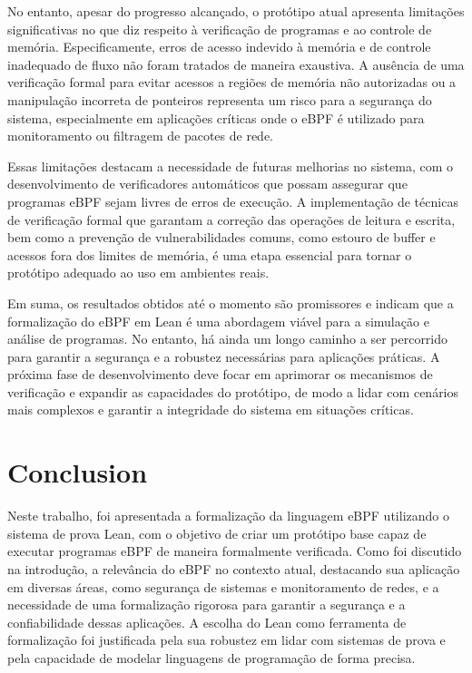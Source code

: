 \documentclass[sigconf]{acmart}
\begin{document}
No entanto, apesar do progresso alcançado, o protótipo atual apresenta limitações significativas no que diz respeito à verificação de programas e ao controle de memória. Especificamente, erros de acesso indevido à memória e de controle inadequado de fluxo não foram tratados de maneira exaustiva. A ausência de uma verificação formal para evitar acessos a regiões de memória não autorizadas ou a manipulação incorreta de ponteiros representa um risco para a segurança do sistema, especialmente em aplicações críticas onde o eBPF é utilizado para monitoramento ou filtragem de pacotes de rede.

Essas limitações destacam a necessidade de futuras melhorias no sistema, com o desenvolvimento de verificadores automáticos que possam assegurar que programas eBPF sejam livres de erros de execução. A implementação de técnicas de verificação formal que garantam a correção das operações de leitura e escrita, bem como a prevenção de vulnerabilidades comuns, como estouro de buffer e acessos fora dos limites de memória, é uma etapa essencial para tornar o protótipo adequado ao uso em ambientes reais.

Em suma, os resultados obtidos até o momento são promissores e indicam que a formalização do eBPF em Lean é uma abordagem viável para a simulação e análise de programas. No entanto, há ainda um longo caminho a ser percorrido para garantir a segurança e a robustez necessárias para aplicações práticas. A próxima fase de desenvolvimento deve focar em aprimorar os mecanismos de verificação e expandir as capacidades do protótipo, de modo a lidar com cenários mais complexos e garantir a integridade do sistema em situações críticas.

\section{Conclusion}

Neste trabalho, foi apresentada a formalização da linguagem eBPF utilizando o sistema de prova Lean, com o objetivo de criar um protótipo base capaz de executar programas eBPF de maneira formalmente verificada. Como foi discutido na introdução, a relevância do eBPF no contexto atual, destacando sua aplicação em diversas áreas, como segurança de sistemas e monitoramento de redes, e a necessidade de uma formalização rigorosa para garantir a segurança e a confiabilidade dessas aplicações. A escolha do Lean como ferramenta de formalização foi justificada pela sua robustez em lidar com sistemas de prova e pela capacidade de modelar linguagens de programação de forma precisa.
\end{document}
